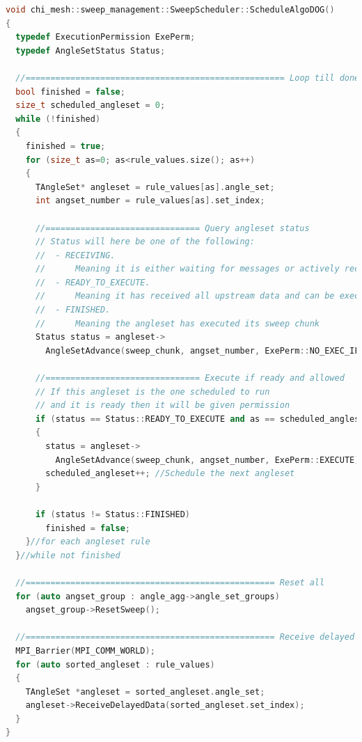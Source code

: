\documentclass[11pt,letterpaper,titlepage]{article}
\numberwithin{equation}{section}
\begin{document}
\begin{lstlisting}[language=c++]
void chi_mesh::sweep_management::SweepScheduler::ScheduleAlgoDOG()
{
  typedef ExecutionPermission ExePerm;
  typedef AngleSetStatus Status;

  //==================================================== Loop till done
  bool finished = false;
  size_t scheduled_angleset = 0;
  while (!finished)
  {
    finished = true;
    for (size_t as=0; as<rule_values.size(); as++)
    {
      TAngleSet* angleset = rule_values[as].angle_set;
      int angset_number = rule_values[as].set_index;

      //=============================== Query angleset status
      // Status will here be one of the following:
      //  - RECEIVING.
      //      Meaning it is either waiting for messages or actively receiving it
      //  - READY_TO_EXECUTE.
      //      Meaning it has received all upstream data and can be executed
      //  - FINISHED.
      //      Meaning the angleset has executed its sweep chunk
      Status status = angleset->
        AngleSetAdvance(sweep_chunk, angset_number, ExePerm::NO_EXEC_IF_READY);

      //=============================== Execute if ready and allowed
      // If this angleset is the one scheduled to run
      // and it is ready then it will be given permission
      if (status == Status::READY_TO_EXECUTE and as == scheduled_angleset)
      {
        status = angleset->
          AngleSetAdvance(sweep_chunk, angset_number, ExePerm::EXECUTE);
        scheduled_angleset++; //Schedule the next angleset
      }

      if (status != Status::FINISHED)
        finished = false;
    }//for each angleset rule
  }//while not finished

  //================================================== Reset all
  for (auto angset_group : angle_agg->angle_set_groups)
    angset_group->ResetSweep();

  //================================================== Receive delayed data
  MPI_Barrier(MPI_COMM_WORLD);
  for (auto sorted_angleset : rule_values)
  {
    TAngleSet *angleset = sorted_angleset.angle_set;
    angleset->ReceiveDelayedData(sorted_angleset.set_index);
  }
}
\end{lstlisting}


\vspace{0.25in}
\end{document}
